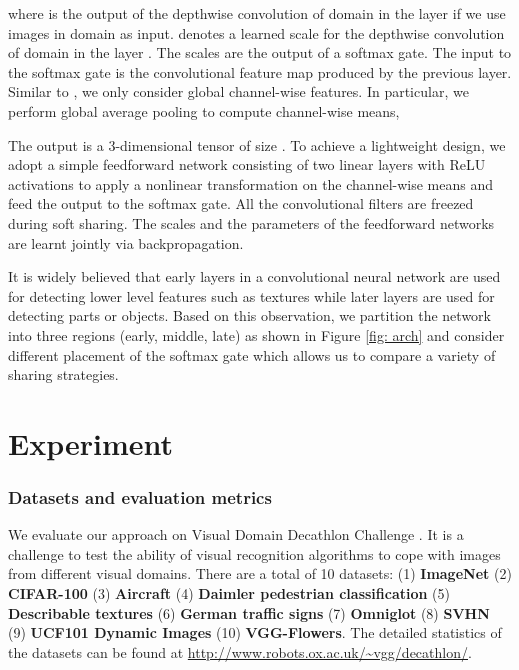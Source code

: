 \documentclass[letterpaper]{article} \usepackage{aaai19}  \usepackage{times}  \usepackage{helvet}  \usepackage{courier}  \usepackage{url}  \usepackage{graphicx}  \usepackage{amssymb}
\begin{document}
\noindent where  is the output of the depthwise convolution of domain  in the layer  if we use images in domain  as input.  denotes a learned scale for the depthwise convolution of domain  in the layer .  The scales  are the output of a softmax gate. The input to the softmax gate is the convolutional feature map  produced by the previous layer. Similar to \cite{veit2017convolutional},  we only consider global channel-wise features. In particular, we perform global average pooling to compute channel-wise means,


The output is a 3-dimensional tensor of size . To achieve a lightweight design, we adopt a simple feedforward network consisting of two linear layers with ReLU activations to apply a nonlinear transformation on the channel-wise means and feed the output to the softmax gate. All the convolutional filters are freezed during soft sharing. The scales  and the parameters of the feedforward networks are learnt jointly via backpropagation.

It is widely believed that early layers in a convolutional neural network are used for detecting lower level features such as textures while later layers are used for detecting parts or objects. Based on this observation, we partition the network into three regions (early, middle, late) as shown in Figure \ref{fig: arch} and consider different placement of the softmax gate which allows us to compare a variety of sharing strategies.

\section{Experiment}

\subsubsection{Datasets and evaluation metrics}
We evaluate our approach on Visual Domain Decathlon Challenge \cite{rebuffi2017learning}. It is a challenge to test the ability of visual recognition algorithms to cope with images from different visual domains. There are a total of 10 datasets: (1) \textbf{ImageNet} (2) \textbf{CIFAR-100} (3) \textbf{Aircraft} (4) \textbf{Daimler pedestrian classification} (5) \textbf{Describable textures} (6) \textbf{German traffic signs} (7) \textbf{Omniglot} (8) \textbf{SVHN} (9) \textbf{UCF101 Dynamic Images} (10) 
\textbf{VGG-Flowers}. The detailed statistics of the datasets can be found at \url{http://www.robots.ox.ac.uk/~vgg/decathlon/}.
\end{document}
